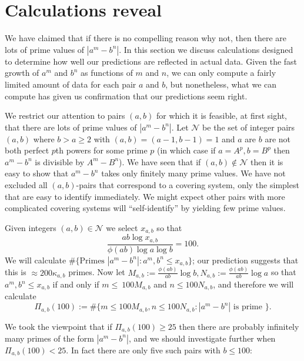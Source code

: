 \documentclass[12pt, a4paper,  reqno, english]{amsart}%
\numberwithin{equation}{section}
\theoremstyle{definition}
\renewcommand{\leq}{\leqslant}
\renewcommand{\geq}{\geqslant}
\begin{document}
\section{Calculations reveal}  
We have claimed that if there is no compelling reason why not, then there are lots of prime values of $|a^m-b^n|$.
In this section we discuss calculations designed to determine how well our predictions are reflected in actual data.
Given the fast growth of $a^m$ and $b^n$ as functions of $m$ and $n$, we can only compute a fairly limited amount of data for each pair $a$ and $b$, but nonetheless, what we can compute has given us confirmation that our predictions seem right.


We restrict our attention to pairs $(a,b)$ for which it is feasible, at first sight, that there are lots of prime values of $|a^m-b^n|$.
Let $\mathcal N$ be the set of integer pairs $(a,b)$ where $b>a\geq 2$ with $(a,b)=(a-1,b-1)=1$ and $a$ are $b$ are not both perfect $p$th powers for some prime $p$ (in which case if $a=A^p, b=B^p$ then $a^m-b^n$ is divisible by $A^m-B^n$). We have seen that if 
$(a,b)\not\in \mathcal N$ then it is easy to show that $a^m-b^n$ takes only finitely many prime values. We have not excluded all $(a,b)$-pairs that correspond to a covering system, only the simplest that are easy to identify immediately. We might expect other pairs with more complicated covering systems will ``self-identify'' by yielding few prime values.




Given integers $(a,b)\in \mathcal N$ we select $x_{a,b}$ so that 
\[
\frac{ab \log x_{a,b}}{\phi(ab) \log a \log b}=100.
\] 
We will calculate $\#\{ \text{Primes }  |a^m-b^n|: a^m,b^n\leq x_{a,b}\}$; our prediction suggests that this is
$ \approx  200 \kappa_{a,b}$ primes.  Now let $M_{a,b}:=\frac{\phi(ab)}{ab}  \log b, N_{a,b}:=\frac{\phi(ab)}{ab}  \log a$ so that 
$a^m,b^n\leq x_{a,b}$ if and only if $m  \leq \ 100 M_{a,b}$ and $n\leq 100N_{a,b}$, and therefore
we will calculate
\[
\Pi_{a,b}(100):=\# \{ m\leq 100 M_{a,b}, n\leq 100N_{a,b}: |a^m-b^n| \text{ is prime }\}.
\]

We took the viewpoint that if $\Pi_{a,b}(100)\geq 25$ then there are probably infinitely many primes of the form
$|a^m-b^n|$, and we should investigate further when $\Pi_{a,b}(100)< 25$. In fact there are only five such pairs with $b\leq 100$:
\end{document}
